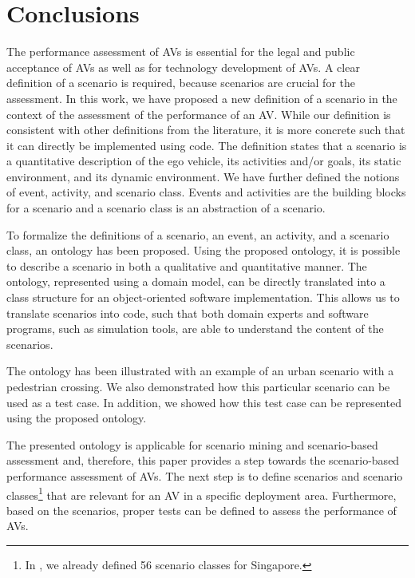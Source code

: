 \cbstart
\section{Conclusions}
\label{sec:conclusion}

The performance assessment of AVs is essential for the legal and public acceptance of AVs as well as for technology development of AVs. 
A clear definition of a scenario is required, because scenarios are crucial for the assessment.
In this work, we have proposed a new definition of a scenario in the context of the assessment of the performance of an AV. 
\cbstartc While our definition is consistent with other definitions from the literature, it is more concrete such that it can directly be implemented using code.
The definition states that a scenario is a quantitative description of the ego vehicle, its activities and/or goals, its static environment, and its dynamic environment. 
We have further defined the notions of event, activity, and scenario class. Events and activities are the building blocks for a scenario and a scenario class is an abstraction of a scenario.

To formalize the definitions of a scenario, an event, an activity, and a scenario class, an ontology has been proposed. Using the proposed ontology, it is possible to describe a scenario in both a qualitative and quantitative manner. The ontology, represented using a domain model, can be directly translated into a class structure for an object-oriented software implementation. This allows us to translate scenarios into code, such that both domain experts and software programs, such as simulation tools, are able to understand the content of the scenarios. 

\cbstart
The ontology has been illustrated with an example of an urban scenario with a pedestrian crossing. 
We also demonstrated how this particular scenario can be used as a test case. In addition, we showed how this test case can be represented using the proposed ontology.
\cbend

The presented ontology is applicable for scenario mining \cite{paardekooper2019dataset6000km} and scenario-based assessment \cite{elrofai2018scenario} and, therefore, this paper provides a step towards the scenario-based performance assessment of AVs. The next step is to define scenarios and scenario classes\footnote{\cbstart In \cite{degelder2019scenarioclasses}, we already defined 56 scenario classes for Singapore.\cbend} that are relevant for an AV in a specific deployment area. Furthermore, based on the scenarios, proper tests can be defined to assess the performance of AVs. 
\cbend
